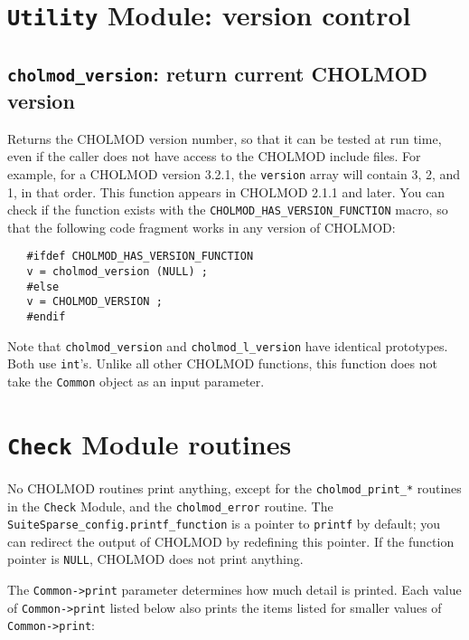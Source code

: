 \documentclass[11pt]{article}
\begin{document}
\newpage \section{{\tt Utility} Module: version control}

\subsection{{\tt cholmod\_version}: return current CHOLMOD version}


Returns the CHOLMOD version number, so that it can be tested at run time, even
if the caller does not have access to the CHOLMOD include files.  For example,
for a CHOLMOD version 3.2.1, the {\tt version} array will contain 3, 2, and 1,
in that order.  This function appears in CHOLMOD 2.1.1 and later.  You can
check if the function exists with the {\tt CHOLMOD\_HAS\_VERSION\_FUNCTION}
macro, so that the following code fragment works in any version of CHOLMOD:

\begin{verbatim}
   #ifdef CHOLMOD_HAS_VERSION_FUNCTION
   v = cholmod_version (NULL) ;
   #else
   v = CHOLMOD_VERSION ;
   #endif
\end{verbatim}

Note that {\tt cholmod\_version} and {\tt cholmod\_l\_version} have identical
prototypes.  Both use {\tt int}'s.  Unlike all other CHOLMOD functions, this
function does not take the {\tt Common} object as an input parameter.

\newpage \section{{\tt Check} Module routines}

No CHOLMOD routines print anything, except for the {\tt cholmod\_print\_*}
routines in the {\tt Check} Module, and the {\tt cholmod\_error} routine.  The
{\tt SuiteSparse\_config.printf\_function} is a pointer to {\tt printf} by
default; you can redirect the output of CHOLMOD by redefining this pointer.  If
the function pointer is {\tt NULL}, CHOLMOD does not print anything.

The {\tt Common->print} parameter determines how much detail is printed.  Each
value of {\tt Common->print} listed below also prints the items listed for
smaller values of {\tt Common->print}:
\end{document}

